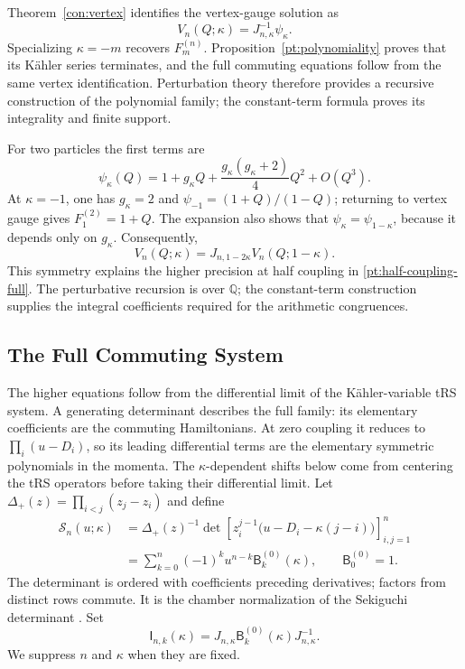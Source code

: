 \documentclass[11pt]{amsart}
\theoremstyle{definition}
\theoremstyle{remark}
\numberwithin{equation}{section}
\newcommand{\Q}{\mathbb Q}
\begin{document}
Theorem~\ref{con:vertex} identifies the vertex-gauge solution as
\[
 V_n(Q;\kappa)=J_{n,\kappa}^{-1}\psi_\kappa.
\]
Specializing $\kappa=-m$ recovers $F_m^{(n)}$.
Proposition~\ref{pt:polynomiality} proves that its K\"ahler
series terminates, and the full commuting equations follow from
the same vertex identification. Perturbation theory therefore
provides a recursive construction of the polynomial family;
the constant-term formula proves its integrality and finite
support.

For two particles the first terms are
\[
 \psi_\kappa(Q)
 =1+g_\kappa Q+\frac{g_\kappa(g_\kappa+2)}4Q^2+O(Q^3).
\]
At $\kappa=-1$, one has $g_\kappa=2$ and
$\psi_{-1}=(1+Q)/(1-Q)$; returning to vertex gauge gives
$F_1^{(2)}=1+Q$.
The expansion also shows that $\psi_\kappa=\psi_{1-\kappa}$,
because it depends only on $g_\kappa$. Consequently,
\begin{equation}\label{cm:coupling-reflection}
 V_n(Q;\kappa)=J_{n,1-2\kappa}V_n(Q;1-\kappa).
\end{equation}
This symmetry explains the higher precision at half coupling
in \eqref{pt:half-coupling-full}. The perturbative recursion
is over $\Q$; the constant-term construction supplies the
integral coefficients required for the arithmetic congruences.

\subsection{The Full Commuting System}
The higher equations follow from the differential limit of the
K\"ahler-variable tRS system. A generating determinant
describes the full family: its elementary coefficients are the
commuting Hamiltonians. At zero coupling it reduces to
$\prod_i(u-D_i)$, so its leading differential terms are the
elementary symmetric polynomials in the momenta. The
$\kappa$-dependent shifts below come from centering the tRS
operators before taking their differential limit. Let
$\Delta_+(z)=\prod_{i<j}(z_j-z_i)$ and define
\begin{equation}\label{tc:determinant}
\begin{aligned}
 \mathscr S_n(u;\kappa)
 &=\Delta_+(z)^{-1}
  \det\left[z_i^{j-1}\bigl(u-D_i-\kappa(j-i)\bigr)\right]_{i,j=1}^n
 \\
 &=\sum_{k=0}^n(-1)^ku^{n-k}\mathsf B_k^{(0)}(\kappa),
 \qquad \mathsf B_0^{(0)}=1.
\end{aligned}
\end{equation}
The determinant is ordered with coefficients preceding
derivatives; factors from distinct rows commute. It is the
chamber normalization of the Sekiguchi determinant \cite{NS13}.
Set
\[
 \mathsf I_{n,k}(\kappa)
 =J_{n,\kappa}\mathsf B_k^{(0)}(\kappa)J_{n,\kappa}^{-1}.
\]
We suppress $n$ and $\kappa$ when they are fixed.
\end{document}
